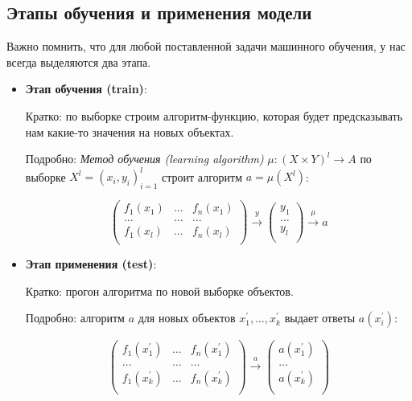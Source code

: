 \documentclass{article}
\begin{document}
\subsection{Этапы обучения и применения модели}

Важно помнить, что для любой поставленной задачи машинного обучения, у нас всегда выделяются два этапа.
\\

\begin{itemize}

\item\textbf{Этап обучения (train)}:

Кратко: по выборке строим алгоритм-функцию, которая будет предсказывать нам какие-то значения на новых объектах.

Подробно: \textit{Метод обучения (learning algorithm)} $\mu : (X \times Y)^l \rightarrow A$ по выборке $X^l = (x_i, y_i)_{i = 1}^l$ строит алгоритм $a = \mu(X^l)$:

$$\boxed{
\begin{pmatrix}
f_1(x_1) & \ldots & f_n(x_1)\\
\ldots & \ldots & \ldots\\
f_1(x_l) & \ldots & f_n(x_l)\\
\end{pmatrix}
\xrightarrow{\ y\ }
\begin{pmatrix}
y_1\\
\ldots\\
y_l\\
\end{pmatrix}
}\xrightarrow{\ \mu\ } a$$

\item \textbf{Этап применения (test)}:

Кратко: прогон алгоритма по новой выборке объектов. 

Подробно: алгоритм $a$ для новых объектов $x_1^{'}, \ldots, x_k^{'}$ выдает ответы $a(x_i^{'})$:

$$\begin{pmatrix}
f_1(x_1^{'}) & \ldots & f_n(x_1^{'})\\
\ldots & \ldots & \ldots\\
f_1(x_k^{'}) & \ldots & f_n(x_k^{'})\\
\end{pmatrix}
\xrightarrow{\ a\ }
\begin{pmatrix}
a(x_1^{'})\\
\ldots\\
a(x_k^{'})\\
\end{pmatrix}$$
\end{itemize}
\end{document}
